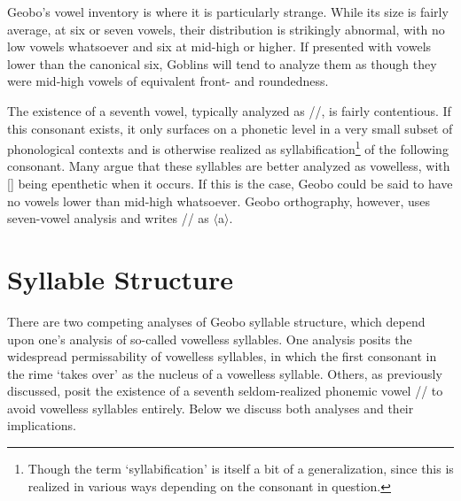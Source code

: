\documentclass[a4paper,11pt,oneside,openany]{memoir}
\newcommand{\til}{\textasciitilde}
\newcommand{\ortho}[1]{$\langle$#1$\rangle$}
\newcommand{\bripa}[1]{[#1]}
\newcommand{\phipa}[1]{/#1/}
\begin{document}
Geobo\engma's vowel inventory is where it is particularly strange. While its size is fairly average, at six or seven vowels, their distribution is strikingly abnormal, with no low vowels whatsoever and six at mid-high or higher. If presented with vowels lower than the canonical six, Goblins will tend to analyze them as though they were mid-high vowels of equivalent front- and roundedness. 

The existence of a seventh vowel, typically analyzed as \phipa{\schwa}, is fairly contentious. If this consonant exists, it only surfaces on a phonetic level in a very small subset of phonological contexts and is otherwise realized as syllabification\footnote{Though the term `syllabification' is itself a bit of a generalization, since this is realized in various ways depending on the consonant in question.} of the following consonant. 
Many argue that these syllables are better analyzed as vowelless, with \bripa{\schwa} being epenthetic when it occurs. If this is the case, Geobo\engma{} could be said to have no vowels lower than mid-high whatsoever. Geobo\engma{} orthography, however, uses seven-vowel analysis and writes \phipa{\schwa} as \ortho{a}.


\section{Syllable Structure}

There are two competing analyses of Geobo\engma{} syllable structure, which depend upon one's analysis of so-called vowelless syllables. One analysis posits the widespread permissability of vowelless syllables, in which the first consonant in the rime `takes over' as the nucleus of a vowelless syllable. Others, as previously discussed, posit the existence of a seventh seldom-realized phonemic vowel \phipa{\schwa} to avoid vowelless syllables entirely. Below we discuss both analyses and their implications.
\end{document}
